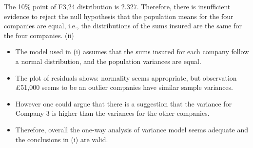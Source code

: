 \documentclass[a4paper,12pt]{article}
\begin{document}
The 10\% point of F3,24 distribution is 2.327. Therefore, there is insufficient
evidence to reject the null hypothesis that the population means for the four
companies are equal, i.e., the distributions of the sums insured are the same for
the four companies.
(ii) 
\begin{itemize}
    \item The model used in (i) assumes that the sums insured for each company follow
a normal distribution, and the population variances are equal.
\item The plot of residuals shows:
normality seems appropriate, but observation £51,000 seems to be an
outlier
companies have similar sample variances. \item However one could argue that there is
a suggestion that the variance for Company 3 is higher than the variances
for the other companies.
\item Therefore, overall the one-way analysis of variance model seems adequate and
the conclusions in (i) are valid.
\end{itemize}
\end{document}

